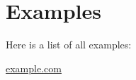 \section{Examples}
Here is a list of all examples\+:\begin{DoxyCompactItemize}
\item 
\hyperlink{example_8com-example}{example.\+com}
\end{DoxyCompactItemize}
